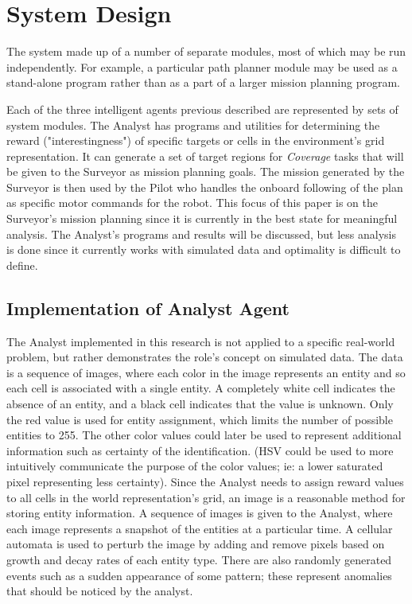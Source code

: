 \documentclass{tamuccthesis}
\begin{document}
\chapter{System Design}

The system made up of a number of separate modules, most of which may be run independently. For example, a particular path planner module may be used as a stand-alone program rather than as a part of a larger mission planning program. 

Each of the three intelligent agents previous described are represented by sets of system modules. The Analyst has programs and utilities for determining the reward ("interestingness") of specific targets or cells in the environment's grid representation. It can generate a set of target regions for \textit{Coverage} tasks that will be given to the Surveyor as mission planning goals. The mission generated by the Surveyor is then used by the Pilot who handles the onboard following of the plan as specific motor commands for the robot. This focus of this paper is on the Surveyor's mission planning since it is currently in the best state for meaningful analysis. The Analyst's programs and results will be discussed, but less analysis is done since it currently works with simulated data and optimality is difficult to define.

\section{Implementation of Analyst Agent}

The Analyst implemented in this research is not applied to a specific real-world problem, but rather demonstrates the role's concept on simulated data. The data is a sequence of images, where each color in the image represents an entity and so each cell is associated with a single entity. A completely white cell indicates the absence of an entity, and a black cell indicates that the value is unknown. Only the red value is used for entity assignment, which limits the number of possible entities to 255. The other color values could later be used to represent additional information such as certainty of the identification. (HSV could be used to more intuitively communicate the purpose of the color values; ie: a lower saturated pixel representing less certainty). Since the Analyst needs to assign reward values to all cells in the world representation's grid, an image is a reasonable method for storing entity information. A sequence of images is given to the Analyst, where each image represents a snapshot of the entities at a particular time. A cellular automata is used to perturb the image by adding and remove pixels based on growth and decay rates of each entity type. There are also randomly generated events such as a sudden appearance of some pattern; these represent anomalies that should be noticed by the analyst. 
\end{document}
